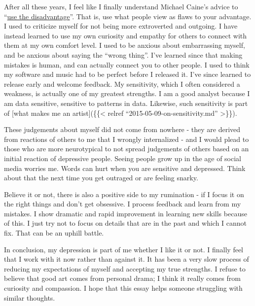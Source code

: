 \documentclass[
]{book}
\begin{document}
After all these years, I feel like I finally understand Michael Caine's advice to ``\href{https://books.google.com/books?id=ES6ZAAAAQBAJ\&pg=PT91\&lpg=PT91\&dq=use+the+disadvantage+caine\&source=bl\&ots=0NxeOR-4iO\&sig=XsFL4clh_687Cr3UN-nZZ_s_bIs\&hl=en\&sa=X\&ei=9XhwVcb-H8nZoATFwoOABA\&ved=0CCAQ6AEwAA\#v=onepage\&q=use\%20the\%20disadvantage\%20caine\&f=false}{use the disadvantage}''. That is, use what people view as flaws to your advantage. I used to criticize myself for not being more extroverted and outgoing. I have instead learned to use my own curiosity and empathy for others to connect with them at my own comfort level. I used to be anxious about embarrassing myself, and be anxious about saying the ``wrong thing''. I've learned since that making mistakes is human, and can actually connect you to other people. I used to think my software and music had to be perfect before I released it. I've since learned to release early and welcome feedback. My sensitivity, which I often considered a weakness, is actually one of my greatest strengths. I am a good analyst because I am data sensitive, sensitive to patterns in data. Likewise, such sensitivity is part of {[}what makes me an artist{]}(\{\{\textless{} relref ``2015-05-09-on-sensitivity.md'' \textgreater\}\}).

These judgements about myself did not come from nowhere - they are derived from reactions of others to me that I wrongly internalized - and I would plead to those who are more neurotypical to not spread judgements of others based on an initial reaction of depressive people. Seeing people grow up in the age of social media worries me. Words can hurt when you are sensitive and depressed. Think about that the next time you get outraged or are feeling snarky.

Believe it or not, there is also a positive side to my rumination - if I focus it on the right things and don't get obsessive. I process feedback and learn from my mistakes. I show dramatic and rapid improvement in learning new skills because of this. I just try not to focus on details that are in the past and which I cannot fix. That can be an uphill battle.

In conclusion, my depression is part of me whether I like it or not. I finally feel that I work with it now rather than against it. It has been a very slow process of reducing my expectations of myself and accepting my true strengths. I refuse to believe that good art comes from personal drama; I think it really comes from curiosity and compassion. I hope that this essay helps someone struggling with similar thoughts.
\end{document}
